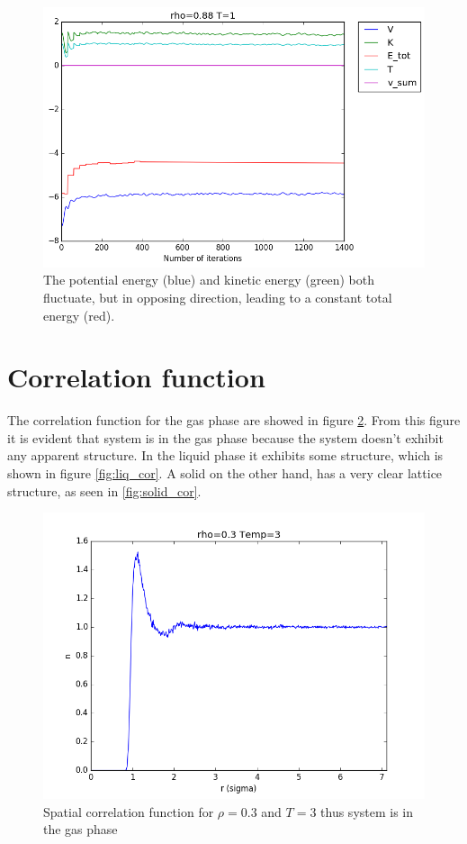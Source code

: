 \documentclass[12pt,a4paper]{report}
\begin{document}
\begin{figure}[H]
\centering
\includegraphics[scale=0.5]{All_rho088_T1_rm35_2.png}
\caption{The potential energy (blue) and kinetic energy (green) both fluctuate, but in opposing direction, leading to a constant total energy (red).}
\label{fig:all_rho}
\end{figure}

\section{Correlation function}

The correlation function for the gas phase are showed in figure \ref{fig:gas_cor}. From this figure it is evident that system is in the gas phase because the system doesn't exhibit any apparent structure. In the liquid phase it exhibits some structure, which is shown in figure \ref{fig:liq_cor}. A solid on the other hand, has a very clear lattice structure, as seen in \ref{fig:solid_cor}.

\begin{figure}[H]
\centering
\includegraphics[scale=0.5]{Correlation_rho03_T3_rm35_2.png}
\caption{Spatial correlation function for $\rho=0.3$ and $T=3$ thus system is in the gas phase}
\label{fig:gas_cor}
\end{figure}
\end{document}
